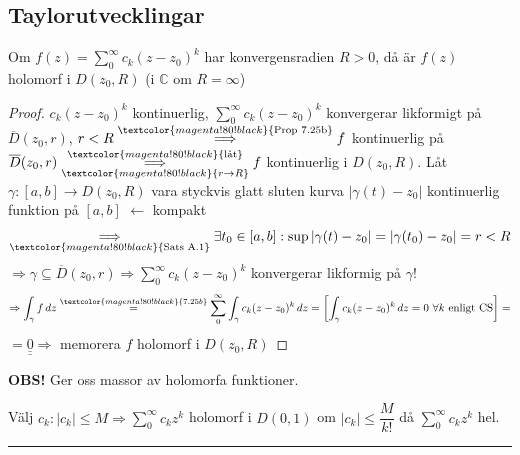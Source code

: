 \subsection{Taylorutvecklingar}
\begin{theorem}[Sats 8.1]
Om $f(z) = \sum_0^\infty c_k(z - z_0)^k$ har konvergensradien $R > 0$, då är $f(z)$ holomorf i $D(z_0, R)$ (i $\mathbb{C}$ om $R = \infty$)
\end{theorem}
\begin{proof}
$c_k(z - z_0)^k$ kontinuerlig, $\sum_0^\infty c_k(z - z_0)^k$ konvergerar likformigt på $\overline{D}(z_0, r)$, $r < R \overset{\textcolor{magenta!80!black}{\text{Prop 7.25b}}}{\Longrightarrow} f$ kontinuerlig på $\overline{D}(z_0, r) \underset{\textcolor{magenta!80!black}{r \to R}}{\overset{\textcolor{magenta!80!black}{\text{låt}}}{\Longrightarrow}} f$ kontinuerlig i $D(z_0, R)$. Låt $\gamma : [a, b] \to D(z_0, R)$ vara styckvis glatt sluten kurva
$|\gamma(t) - z_0|$ kontinuerlig funktion på $[a, b]$ \textcolor{magenta!80!black}{$\leftarrow$ kompakt}
\[ \underset{\textcolor{magenta!80!black}{\text{Sats A.1}}}{\Longrightarrow} \exists t_0 \in [a, b] : \sup|\gamma(t) - z_0| = |\gamma(t_0) - z_0| = r < R \]
$\Rightarrow \gamma \subseteq \overline{D}(z_0, r) \Longrightarrow \sum_0^\infty c_k(z - z_0)^k$ konvergerar likformig på $\gamma$!
\[ \Rightarrow \int_\gamma f\,dz \overset{\textcolor{magenta!80!black}{7.25b}}{=} \sum_0^\infty \int_\gamma c_k(z - z_0)^k\,dz = \left[ \int_\gamma c_k(z - z_0)^k\,dz = 0 \ \forall k \text{ enligt CS} \right] = \]
$= \underline{\underline{0}} \Longrightarrow$ memorera $f$ holomorf i $D(z_0, R)$
\end{proof}

\textcolor{red!70!black}{\textbf{OBS!}} Ger oss massor av holomorfa funktioner.

Välj $c_k : |c_k| \le M \Rightarrow \sum_0^\infty c_k z^k$ holomorf i $D(0, 1)$ om $|c_k| \le \dfrac{M}{k!}$ då $\sum_0^\infty c_k z^k$ hel.

\noindent\rule{\linewidth}{0.4pt}

